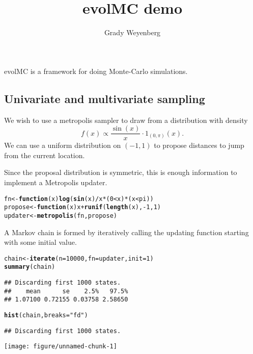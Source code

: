\documentclass{article}\usepackage[]{graphicx}\usepackage[]{color}
\title{evolMC demo}
\author{Grady Weyenberg}
\makeatletter
\def\maxwidth{ %
  \ifdim\Gin@nat@width>\linewidth
    \linewidth
  \else
    \Gin@nat@width
  \fi
}
\newcommand{\hlnum}[1]{\textcolor[rgb]{0.686,0.059,0.569}{#1}}%
\newcommand{\hlstr}[1]{\textcolor[rgb]{0.192,0.494,0.8}{#1}}%
\newcommand{\hlopt}[1]{\textcolor[rgb]{0,0,0}{#1}}%
\newcommand{\hlstd}[1]{\textcolor[rgb]{0.345,0.345,0.345}{#1}}%
\newcommand{\hlkwa}[1]{\textcolor[rgb]{0.161,0.373,0.58}{\textbf{#1}}}%
\newcommand{\hlkwb}[1]{\textcolor[rgb]{0.69,0.353,0.396}{#1}}%
\newcommand{\hlkwc}[1]{\textcolor[rgb]{0.333,0.667,0.333}{#1}}%
\newcommand{\hlkwd}[1]{\textcolor[rgb]{0.737,0.353,0.396}{\textbf{#1}}}%
\newenvironment{kframe}{%
 \def\at@end@of@kframe{}%
 \ifinner\ifhmode%
  \def\at@end@of@kframe{\end{minipage}}%
  \begin{minipage}{\columnwidth}%
 \fi\fi%
 \def\FrameCommand##1{\hskip\@totalleftmargin \hskip-\fboxsep
 \colorbox{shadecolor}{##1}\hskip-\fboxsep
     \hskip-\linewidth \hskip-\@totalleftmargin \hskip\columnwidth}%
 \MakeFramed {\advance\hsize-\width
   \@totalleftmargin\z@ \linewidth\hsize
   \@setminipage}}%
 {\par\unskip\endMakeFramed%
 \at@end@of@kframe}
\newenvironment{knitrout}{}{} %
\makeatother
\begin{document}
\maketitle

evolMC is a framework for doing Monte-Carlo simulations.

\subsection{Univariate and multivariate sampling}
We wish to use a metropolis sampler to draw from a distribution with
density \[ f(x) \propto \frac{\sin(x)}{x} \cdot 1_{(0,\pi)}(x). \] We
can use a uniform distribution on $(-1,1)$ to propose distances to
jump from the current location.


Since the proposal distribution is symmetric, this is enough
information to implement a Metropolis updater.

\begin{knitrout}
\color{fgcolor}\begin{kframe}
\begin{alltt}
\hlstd{fn} \hlkwb{<-} \hlkwa{function}\hlstd{(}\hlkwc{x}\hlstd{)} \hlkwd{log}\hlstd{(}\hlkwd{sin}\hlstd{(x)}\hlopt{/}\hlstd{x} \hlopt{*} \hlstd{(}\hlnum{0} \hlopt{<} \hlstd{x)} \hlopt{*} \hlstd{(x} \hlopt{<} \hlstd{pi))}
\hlstd{propose} \hlkwb{<-} \hlkwa{function}\hlstd{(}\hlkwc{x}\hlstd{) x} \hlopt{+} \hlkwd{runif}\hlstd{(}\hlkwd{length}\hlstd{(x),} \hlopt{-}\hlnum{1}\hlstd{,} \hlnum{1}\hlstd{)}
\hlstd{updater} \hlkwb{<-} \hlkwd{metropolis}\hlstd{(fn, propose)}
\end{alltt}
\end{kframe}
\end{knitrout}


A Markov chain is formed by iteratively calling the updating function
starting with some initial value.
\begin{knitrout}
\color{fgcolor}\begin{kframe}
\begin{alltt}
\hlstd{chain} \hlkwb{<-} \hlkwd{iterate}\hlstd{(}\hlkwc{n} \hlstd{=} \hlnum{10000}\hlstd{,} \hlkwc{fn} \hlstd{= updater,} \hlkwc{init} \hlstd{=} \hlnum{1}\hlstd{)}
\hlkwd{summary}\hlstd{(chain)}
\end{alltt}
\begin{verbatim}
## Discarding first 1000 states.
##    mean      se    2.5%   97.5% 
## 1.07100 0.72155 0.03758 2.58650
\end{verbatim}
\begin{alltt}
\hlkwd{hist}\hlstd{(chain,} \hlkwc{breaks} \hlstd{=} \hlstr{"fd"}\hlstd{)}
\end{alltt}
\begin{verbatim}
## Discarding first 1000 states.
\end{verbatim}
\end{kframe}
\texttt{[image: figure/unnamed-chunk-1]} 

\end{knitrout}
\end{document}
